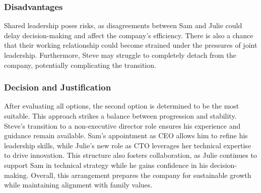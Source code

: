 \documentclass[a4paper,10pt]{article}
\begin{document}
\subsubsection*{Disadvantages}
Shared leadership poses risks, as disagreements between Sam and Julie could delay decision-making and affect the company’s efficiency. There is also a chance that their working relationship could become strained under the pressures of joint leadership. Furthermore, Steve may struggle to completely detach from the company, potentially complicating the transition.

\subsubsection*{Decision and Justification}

After evaluating all options, the second option is determined to be the most suitable. This approach strikes a balance between progression and stability. Steve’s transition to a non-executive director role ensures his experience and guidance remain available. Sam’s appointment as CEO allows him to refine his leadership skills, while Julie’s new role as CTO leverages her technical expertise to drive innovation. This structure also fosters collaboration, as Julie continues to support Sam in technical strategy while he gains confidence in his decision-making. Overall, this arrangement prepares the company for sustainable growth while maintaining alignment with family values.
\end{document}
